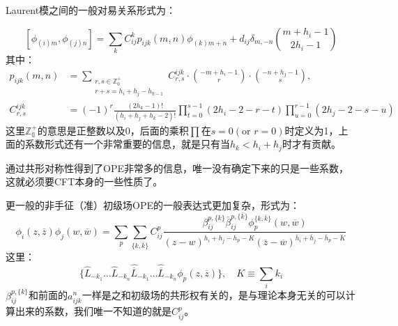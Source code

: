 Laurent模之间的一般对易关系形式为：
\begin{theorem}
	\begin{equation}\label{eq:31.45}
		\boxed{\left[\phi_{(i)m},\phi_{(j)n}\right]=\sum_kC_{ij}^kp_{ijk}(m,n)\phi_{(k)m+n}+d_{ij}\delta_{m,-n}\binom{m+h_i-1}{2h_i-1}}
	\end{equation}
	其中：
	\begin{equation}
		\begin{aligned}p_{ijk}(m,n)&=\sum_{\substack{r,s\in\mathbb{Z}_0^+\\r+s=h_i+h_j-h_{k-1}}}C_{r,s}^{ijk}\cdot\binom{-m+h_i-1}{r}\cdot\binom{-n+h_j-1}{s},\\C_{r,s}^{ijk}&=(-1)^r\frac{(2h_k-1)!}{(h_i+h_j+h_k-2)!}\prod_{t=0}^{s-1}(2h_i-2-r-t)\prod_{u=0}^{r-1}(2h_j-2-s-u)\end{aligned}
	\end{equation}
	这里$\mathbb{Z_0^+}$的意思是正整数以及0，后面的乘积$\prod$在$s=0(\text{or }r=0)$时定义为1，上面的系数形式还有一个非常重要的信息，就是只有当$h_k<h_i+h_j$时才有贡献。
\end{theorem}
通过共形对称性得到了OPE非常多的信息，唯一没有确定下来的只是一些系数，这就必须要CFT本身的一些性质了。

更一般的非手征（准）初级场OPE的一般表达式更加复杂，形式为：
\begin{equation}
	\boxed{
		\phi_i(z,\overline{z})\phi_j(w,\overline{w})=\sum_{p}\sum_{\{k,\overline{k}\}}C_{ij}^p\frac{\beta_{ij}^{p,\{k\}}\overline{\beta}_{ij}^{p,\{\overline{k}\}}\phi_{p}^{\{k,\overline{k}\}}(w,\overline{w})}{(z-w)^{h_i+h_j-h_p-K}(\overline{z}-\overline{w})^{\overline{h}_i+\overline{h}_j-\overline{h}_p-\overline{K}}}
	}
\end{equation}
这里：
\begin{equation}
	\{\hat{L}_{-k_1}\ldots\hat{L}_{-k_n}\hat{\overline{L}}_{-k_1}\ldots\hat{\overline{L}}_{-k_n}\phi_p(z,\overline{z})\},\quad K\equiv\sum_i k_i
\end{equation}
$\beta_{ij}^{p,\{k\}}$和前面的$a^n_{ijk}$一样是之和初级场的共形权有关的，是与理论本身无关的可以计算出来的系数，我们唯一不知道的就是$C_{ij}^p$。

